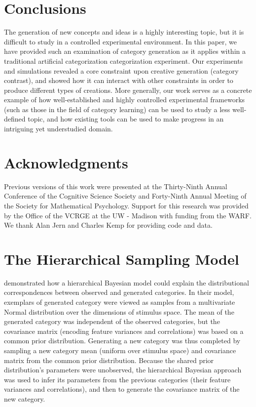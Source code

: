 \documentclass[12pt]{article}
\begin{document}
\begin{flushleft}
\section{Conclusions}

The generation of new concepts and ideas is a highly interesting topic, but it is difficult to study in a controlled experimental environment. In this paper, we have provided such an examination of category generation as it applies within a traditional artificial categorization categorization experiment. Our experiments and simulations revealed a core constraint upon creative generation (category contrast), and showed how it can interact with other constraints in order to produce different types of creations. More generally, our work serves as a concrete example of how well-established and highly controlled experimental frameworks (such as those in the field of category learning) can be used to study a less well-defined topic, and how existing tools can be used to make progress in an intriguing yet understudied domain.


\clearpage
\section{Acknowledgments}
Previous versions of this work were presented at the Thirty-Ninth Annual Conference of the Cognitive Science Society and Forty-Ninth Annual Meeting of the Society for Mathematical Psychology. Support for this research was provided by the Office of the VCRGE at the UW - Madison with funding from the WARF. We thank Alan Jern and Charles Kemp for providing code and data.
\end{flushleft}


\clearpage


\clearpage


\appendix
{}

\section{The Hierarchical Sampling Model}
\label{ap:hsampling-definition}

\cite{jern2013probabilistic} demonstrated how a hierarchical Bayesian model could explain the distributional correspondences between observed and generated categories. In their model, exemplars of generated category were viewed as samples from a multivariate Normal distribution over the dimensions of stimulus space. The mean of the generated category was independent of the observed categories, but the covariance matrix (encoding feature variances and correlations) was based on a common prior distribution. Generating a new category was thus completed by sampling a new category mean (uniform over stimulus space) and covariance matrix from the common prior distribution. Because the shared prior distribution's parameters were unobserved, the hierarchical Bayesian approach was used to infer its parameters from the previous categories (their feature variances and correlations), and then to generate the covariance matrix of the new category.
\end{document}
